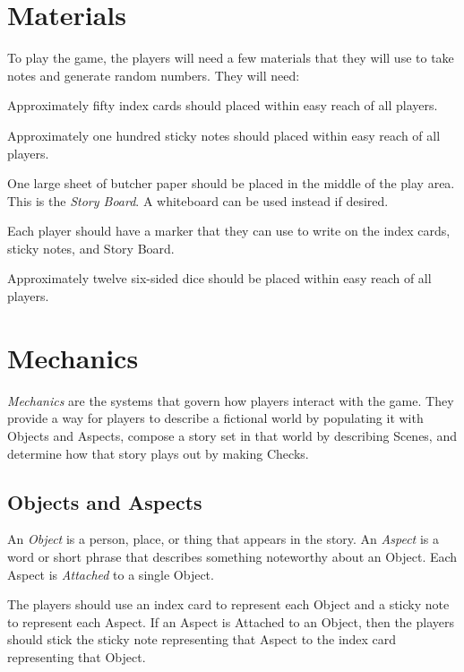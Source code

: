 \documentclass[12pt, a5paper, parskip=half-]{scrartcl}
\begin{document}
\section*{Materials}
To play the game, the players will need a few materials that they will use to take notes and generate random numbers. They will need:
\begin{description}[leftmargin=0pt]
	\item[Index Cards] Approximately fifty index cards should placed within easy reach of all players. 
	\item[Sticky Notes] Approximately one hundred sticky notes should placed within easy reach of all players.
	\item[Butcher Paper]	 One large sheet of butcher paper should be placed in the middle of the play area.  This is the \emph{Story Board}. A whiteboard can be used instead if desired.
	\item[Markers] Each player should have a marker that they can use to write on the index cards, sticky notes, and Story Board.
	\item[Dice] Approximately twelve six-sided dice should be placed within easy reach of all players. 
\end{description}

\newpage

\section*{Mechanics}    
\emph{Mechanics} are the systems that govern how players interact with the game.
They provide a way for players to describe a fictional world by populating it with Objects and Aspects, compose a story set in that world by describing Scenes, and determine how that story plays out by making Checks.

\subsection*{Objects and Aspects}
An \emph{Object} is a person, place, or thing that appears in the story.
An \emph{Aspect} is a word or short phrase that describes something noteworthy about an Object.
Each Aspect is \emph{Attached} to a single Object.

The players should use an index card to represent each Object and a sticky note to represent each Aspect.  If an Aspect is Attached to an Object, then the players should stick the sticky note representing that Aspect to the index card representing that Object.
\end{document}
